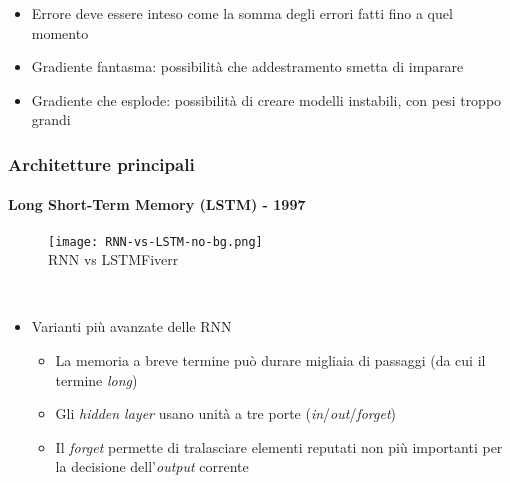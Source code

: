 \begin{frame}[t]
{\begin{minipage}[t]{\textwidth}
\begin{itemize}[leftmargin=10pt,align=right]
\begin{itemize}[leftmargin=10pt,align=right]
				\begin{itemize}[leftmargin=10pt,align=right]
					\item[\alert{\faArrowCircleRight}] Errore deve essere inteso come la somma degli errori fatti fino a quel momento
					\onslide<7->\item[\alert{\faArrowCircleRight}] \alert{Gradiente fantasma:} possibilità che addestramento smetta di imparare
					\onslide<8->\item[\alert{\faArrowCircleRight}] \alert{Gradiente che esplode:} possibilità di creare modelli instabili, con pesi troppo grandi
				\end{itemize}
			\end{itemize}
		\end{itemize}
	\end{minipage}
}
\end{frame}
%
\begin{frame}[t] \frametitle{Architetture principali}
\framesubtitle{Long Short-Term Memory (LSTM) - 1997}
{\scriptsize
\vspace*{-.5cm}
	\begin{minipage}[t]{\textwidth}
		\begin{figure}
			\centering
			\texttt{[image: RNN-vs-LSTM-no-bg.png]}
			\\RNN vs LSTM\textsuperscript{\textcopyright}Fiverr
		\end{figure}
	\end{minipage}
	\\\vspace*{.3cm}
	\begin{minipage}[t]{\textwidth}
	\begin{itemize}[leftmargin=10pt,align=right]
		\onslide<1->\item[\alert{\faArrowCircleRight}] Varianti più avanzate delle RNN
		\begin{itemize}[leftmargin=10pt,align=right]
			\item[\alert{\faArrowCircleRight}] La memoria a breve termine può durare migliaia di passaggi (da cui il termine \emph{long})
			\onslide<2->\item[\alert{\faArrowCircleRight}] Gli \emph{hidden layer} usano unità a tre porte (\emph{in}/\emph{out}/\emph{forget})
			\onslide<3->\item[\alert{\faArrowCircleRight}] Il \emph{forget} permette di tralasciare elementi reputati non più importanti per la decisione dell'\emph{output} corrente
		\end{itemize}
	\end{itemize}
	\end{minipage}
}
\end{frame}
